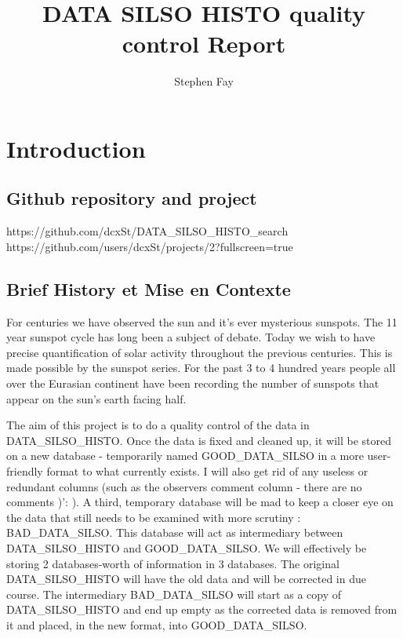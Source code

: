 \documentclass[12pt]{article}
\renewcommand\qedsymbol{$\Smiley$}
\begin{document}
 
 
\title{DATA SILSO HISTO quality control Report}
\author{Stephen Fay}
\maketitle

\section{Introduction}
\subsection{Github repository and project}
    https://github.com/dcxSt/DATA\_SILSO\_HISTO\_search \\
    https://github.com/users/dcxSt/projects/2?fullscreen=true
    
\subsection{Brief History et Mise en Contexte}

For centuries we have observed the sun and it's ever mysterious sunspots. The 11 year sunspot cycle has long been a subject of debate. Today we wish to have precise quantification of solar activity throughout the previous centuries. This is made possible by the sunspot series. For the past 3 to 4 hundred years people all over the Eurasian continent have been recording the number of sunspots that appear on the sun's earth facing half. 

The aim of this project is to do a quality control of the data in DATA\_SILSO\_HISTO. Once the data is fixed and cleaned up, it will be stored on a new database - temporarily named GOOD\_DATA\_SILSO in a more user-friendly format to what currently exists. I will also get rid of any useless or redundant columns (such as the observers comment column - there are no comments )': ). A third, temporary database will be mad to keep a closer eye on the data that still needs to be examined with more scrutiny : BAD\_DATA\_SILSO. This database will act as intermediary between DATA\_SILSO\_HISTO and GOOD\_DATA\_SILSO. We will effectively be storing 2 databases-worth of information in 3 databases. The original DATA\_SILSO\_HISTO will have the old data and will be corrected in due course. The intermediary BAD\_DATA\_SILSO will start as a copy of DATA\_SILSO\_HISTO and end up empty as the corrected data is removed from it and placed, in the new format, into GOOD\_DATA\_SILSO.
\end{document}
